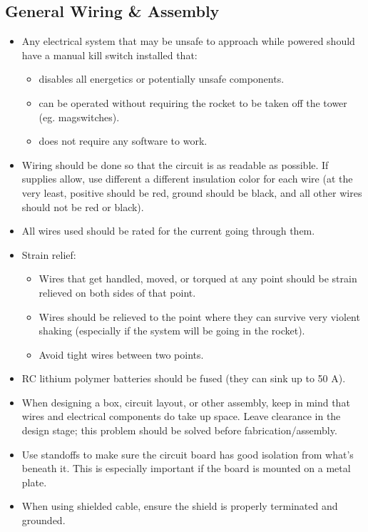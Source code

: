 \documentclass{article}
\begin{document}
\subsection{General Wiring \& Assembly}
\begin{itemize}
\item Any electrical system that may be unsafe to approach while powered should have a manual kill switch installed that:
    \begin{itemize}
    \item disables all energetics or potentially unsafe components.
    \item can be operated without requiring the rocket to be taken off the tower (eg. magswitches).
    \item does not require any software to work.
    \end{itemize}
\item Wiring should be done so that the circuit is as readable as possible. If supplies allow, use different a different insulation color for each wire (at the very least, positive should be red, ground should be black, and all other wires should not be red or black).
\item All wires used should be rated for the current going through them.
\item Strain relief:
    \begin{itemize}
    \item Wires that get handled, moved, or torqued at any point should be strain relieved on both sides of that point.
    \item Wires should be relieved to the point where they can survive very violent shaking (especially if the system will be going in the rocket).
    \item Avoid tight wires between two points.
    \end{itemize}
\item RC lithium polymer batteries should be fused (they can sink up to 50 A).
\item When designing a box, circuit layout, or other assembly, keep in mind that wires and electrical components do take up space. Leave clearance in the design stage; this problem should be solved before fabrication/assembly.
\item Use standoffs to make sure the circuit board has good isolation from what's beneath it. This is especially important if the board is mounted on a metal plate.
\item When using shielded cable, ensure the shield is properly terminated and grounded.
\end{itemize}
\end{document}
